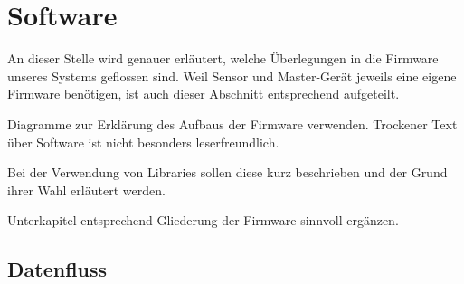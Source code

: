 \chapter{Software}
\label{chap:software}


An  dieser  Stelle wird  genauer  erl\"autert,  welche \"Uberlegungen  in  die
Firmware  unseres  Systems  geflossen  sind. Weil  Sensor  und  Master-Ger\"at
jeweils  eine   eigene  Firmware   ben\"otigen,  ist  auch   dieser  Abschnitt
entsprechend aufgeteilt.

\anweisung   Diagramme    zur   Erkl\"arung    des   Aufbaus    der   Firmware
verwenden. Trockener    Text    \"uber    Software   ist    nicht    besonders
leserfreundlich.

\anweisung Bei der Verwendung von  Libraries sollen diese kurz beschrieben und
der Grund ihrer Wahl erl\"autert werden.

\anweisung   Unterkapitel  entsprechend   Gliederung  der   Firmware  sinnvoll
erg\"anzen.


{\begin{a3pages}
\section{Datenfluss}
\label{sec:fw:dataFlow}
\setlength{\parindentbak}{\parindent}
\noindent{}
\hspace*{5mm}
\end{a3pages}}


